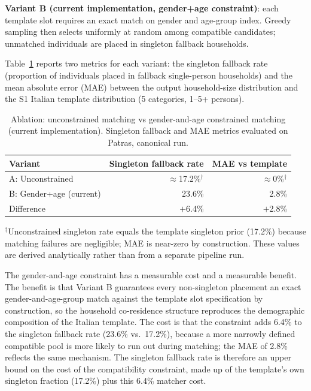 \documentclass{article}
\begin{document}
\textbf{Variant B (current implementation, gender+age constraint)}: each template slot requires an exact match on gender and age-group index. Greedy sampling then selects uniformly at random among compatible candidates; unmatched individuals are placed in singleton fallback households.

Table~\ref{tab:ablation} reports two metrics for each variant: the singleton fallback rate (proportion of individuals placed in fallback single-person households) and the mean absolute error (MAE) between the output household-size distribution and the S1 Italian template distribution (5 categories, 1--5+ persons).

\begin{table}[htbp]
\centering
\caption{Ablation: unconstrained matching vs gender-and-age constrained matching (current implementation). Singleton fallback and MAE metrics evaluated on Patras, canonical run.}
\label{tab:ablation}
\begin{tabular}{lrr}
\toprule
Variant & Singleton fallback rate & MAE vs template \\
\midrule
A: Unconstrained        & $\approx$17.2\%$^\dagger$ & $\approx$0\%$^\dagger$ \\
B: Gender+age (current) & 23.6\%                    & 2.8\% \\
\midrule
Difference              & $+$6.4\%                 & $+$2.8\% \\
\bottomrule
\end{tabular}
\begin{flushleft}
{\small $^\dagger$Unconstrained singleton rate equals the template singleton prior (17.2\%) because matching failures are negligible; MAE is near-zero by construction. These values are derived analytically rather than from a separate pipeline run.}
\end{flushleft}
\end{table}

The gender-and-age constraint has a measurable cost and a measurable benefit. The benefit is that Variant B guarantees every non-singleton placement an exact gender-and-age-group match against the template slot specification by construction, so the household co-residence structure reproduces the demographic composition of the Italian template. The cost is that the constraint adds 6.4\% to the singleton fallback rate (23.6\% vs.\ 17.2\%), because a more narrowly defined compatible pool is more likely to run out during matching; the MAE of 2.8\% reflects the same mechanism. The singleton fallback rate is therefore an upper bound on the cost of the compatibility constraint, made up of the template's own singleton fraction (17.2\%) plus this 6.4\% matcher cost.
\end{document}
